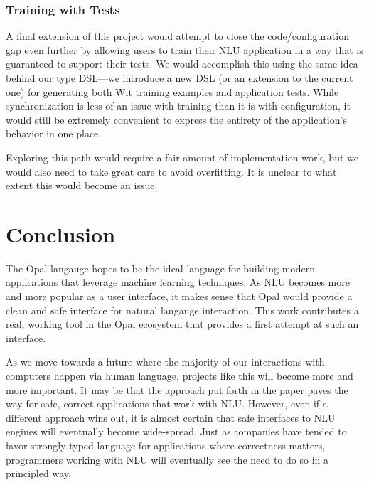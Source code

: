 \documentclass[twocolumn]{article}
\begin{document}
\subsubsection{Training with Tests}
A final extension of this project would attempt to close the code/configuration
gap even further by allowing users to train their NLU application in a way that
is guaranteed to support their tests. We would accomplish this using the same
idea behind our type DSL---we introduce a new DSL (or an extension to the
current one) for generating both Wit training examples and application tests.
While synchronization is less of an issue with training than it is with
configuration, it would still be extremely convenient to express the entirety of
the application's behavior in one place.

Exploring this path would require a fair amount of implementation work, but we
would also need to take great care to avoid overfitting. It is unclear to what
extent this would become an issue.

\section{Conclusion} \label{conclusion}
The Opal langauge hopes to be the ideal language for building modern
applications that leverage machine learning techniques. As NLU becomes more and
more popular as a user interface, it makes sense that Opal would provide a clean
and safe interface for natural langauge interaction. This work contributes a
real, working tool in the Opal ecosystem that provides a first attempt at such
an interface.

As we move towards a future where the majority of our interactions with
computers happen via human language, projects like this will become more and
more important. It may be that the approach put forth in the paper paves the way
for safe, correct applications that work with NLU. However, even if a different
approach wins out, it is almost certain that safe interfaces to NLU engines will
eventually become wide-spread. Just as companies have tended to favor strongly
typed language for applications where correctness matters, programmers working
with NLU will eventually see the need to do so in a principled way.

{}

\end{document}

